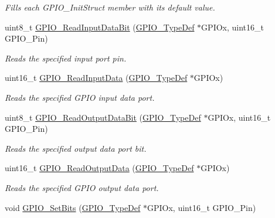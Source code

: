 \begin{DoxyCompactItemize}
\begin{DoxyCompactList}\small\item\em Fills each G\+P\+I\+O\+\_\+\+Init\+Struct member with its default value. \end{DoxyCompactList}\item 
uint8\+\_\+t \mbox{\hyperlink{group___g_p_i_o___private___functions_ga98772ef6b639b3fa06c8ae5ba28d3aaa}{G\+P\+I\+O\+\_\+\+Read\+Input\+Data\+Bit}} (\mbox{\hyperlink{struct_g_p_i_o___type_def}{G\+P\+I\+O\+\_\+\+Type\+Def}} $\ast$G\+P\+I\+Ox, uint16\+\_\+t G\+P\+I\+O\+\_\+\+Pin)
\begin{DoxyCompactList}\small\item\em Reads the specified input port pin. \end{DoxyCompactList}\item 
uint16\+\_\+t \mbox{\hyperlink{group___g_p_i_o___private___functions_ga139a33adc8409288e9f193bbebb5a0f7}{G\+P\+I\+O\+\_\+\+Read\+Input\+Data}} (\mbox{\hyperlink{struct_g_p_i_o___type_def}{G\+P\+I\+O\+\_\+\+Type\+Def}} $\ast$G\+P\+I\+Ox)
\begin{DoxyCompactList}\small\item\em Reads the specified G\+P\+IO input data port. \end{DoxyCompactList}\item 
uint8\+\_\+t \mbox{\hyperlink{group___g_p_i_o___private___functions_ga138270f8695b105b7c6ed405792919c1}{G\+P\+I\+O\+\_\+\+Read\+Output\+Data\+Bit}} (\mbox{\hyperlink{struct_g_p_i_o___type_def}{G\+P\+I\+O\+\_\+\+Type\+Def}} $\ast$G\+P\+I\+Ox, uint16\+\_\+t G\+P\+I\+O\+\_\+\+Pin)
\begin{DoxyCompactList}\small\item\em Reads the specified output data port bit. \end{DoxyCompactList}\item 
uint16\+\_\+t \mbox{\hyperlink{group___g_p_i_o___private___functions_gaf8938a34280b7dc3e39872a7c17bb323}{G\+P\+I\+O\+\_\+\+Read\+Output\+Data}} (\mbox{\hyperlink{struct_g_p_i_o___type_def}{G\+P\+I\+O\+\_\+\+Type\+Def}} $\ast$G\+P\+I\+Ox)
\begin{DoxyCompactList}\small\item\em Reads the specified G\+P\+IO output data port. \end{DoxyCompactList}\item 
void \mbox{\hyperlink{group___g_p_i_o___private___functions_ga9e1352eed7c6620e18af2d86f6b6ff8e}{G\+P\+I\+O\+\_\+\+Set\+Bits}} (\mbox{\hyperlink{struct_g_p_i_o___type_def}{G\+P\+I\+O\+\_\+\+Type\+Def}} $\ast$G\+P\+I\+Ox, uint16\+\_\+t G\+P\+I\+O\+\_\+\+Pin)

\end{DoxyCompactItemize}
